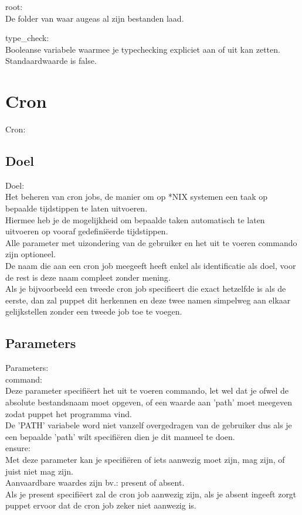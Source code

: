 root:\\
De folder van waar augeas al zijn bestanden laad.

type\_check:\\
Booleanse variabele waarmee je typechecking expliciet aan of uit kan zetten. Standaardwaarde is false.

\section{Cron}
Cron:\\
\subsection{Doel}
Doel:\\
	Het beheren van cron jobs, de manier om op *NIX systemen een taak op bepaalde tijdstippen te laten uitvoeren.\\
	Hiermee heb je de mogelijkheid om bepaalde taken automatisch te laten uitvoeren op vooraf gedefini\"{e}erde tijdstippen.\\
	Alle parameter met uizondering van de gebruiker en het uit te voeren commando zijn optioneel.\\

	De naam die aan een cron job meegeeft heeft enkel als identificatie als doel, voor de rest is deze naam compleet zonder mening.\\
	Als je bijvoorbeeld een tweede cron job specifieert die exact hetzelfde is als de eerste, dan zal puppet dit herkennen en deze twee namen simpelweg aan elkaar gelijkstellen zonder een tweede job toe te voegen.\\



\subsection{Parameters}
Parameters:\\

		command:\\
		Deze parameter specifi\"{e}ert het uit te voeren commando, let wel dat je ofwel de absolute bestandsnaam moet opgeven, of een waarde aan 'path' moet meegeven zodat puppet het programma vind.\\
		De 'PATH' variabele word niet vanzelf overgedragen van de gebruiker dus als je een bepaalde 'path' wilt specifi\"{e}ren dien je dit manueel te doen.\\

		ensure:\\
		Met deze parameter kan je specifi\"{e}ren of iets aanwezig moet zijn, mag zijn, of juist niet mag zijn.\\
		Aanvaardbare waardes zijn bv.: present of absent.\\
		Als je present specifi\"{e}ert zal de cron job aanwezig zijn, als je absent ingeeft zorgt puppet ervoor dat de cron job zeker niet aanwezig is.\\

